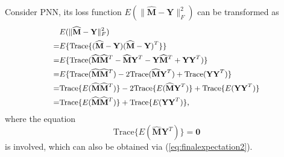 \documentclass[journal]{IEEEtran}
\begin{document}
Consider PNN, its loss function $E(\|\widehat {\mathbf {M}} - {\mathbf{Y}}\|^2_F)$ can be transformed as
\begin{equation} \small \label{eq:CostInitPNN}
\begin{split}
&E(\|\widehat{\mathbf {M}} - {\mathbf{Y}}\|^2_F)\\
=&E\{\mathrm{Trace}\{(\widehat{\mathbf{M}}-\mathbf{Y})(\widehat{\mathbf{M}}-\mathbf{Y})^T\}\}\\
=&E\{\mathrm{Trace}(\widehat{\mathbf{M}}\widehat{\mathbf{M}}^T-\widehat{\mathbf{M}}\mathbf{Y}^T-
\mathbf{Y}\widehat{\mathbf{M}}^T+\mathbf{Y}\mathbf{Y}^T)\}\\
=&E\{\mathrm{Trace}(\widehat{\mathbf{M}}\widehat{\mathbf{M}}^T)-2\mathrm{Trace}(\widehat{\mathbf{M}}\mathbf{Y}^T)
+\mathrm{Trace}(\mathbf{Y}\mathbf{Y}^T)\}\\
=&\mathrm{Trace}\{E(\widehat {\mathbf {M}}\widehat {\mathbf {M}}^T)\}-2\mathrm{Trace}\{E(\widehat {\mathbf {M}}\mathbf{Y}^T)\}
+\mathrm{Trace}\{E(\mathbf{Y}\mathbf{Y}^T)\}\\
=&\mathrm{Trace}\{E(\widehat {\mathbf {M}}\widehat {\mathbf {M}}^T)\}+\mathrm{Trace}\{E(\mathbf{Y}\mathbf{Y}^T)\},
\end{split}
\end{equation}
where the equation
\begin{equation}
\mathrm{Trace}\{E({\widehat{\mathbf{M}}}\mathbf{Y}^T)\}=\textbf{0}
\end{equation}
is involved, which can also be obtained via (\ref{eq:finalexpectation2}).
\end{document}
